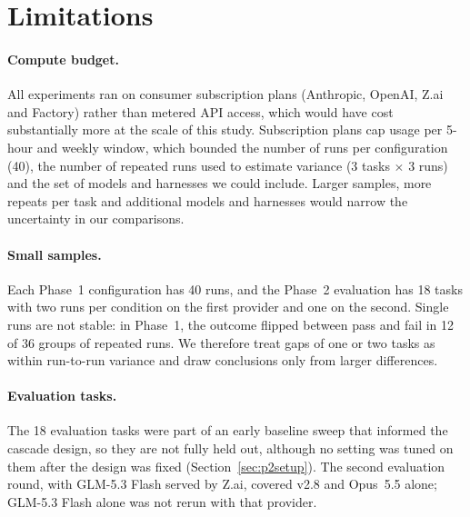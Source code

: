 \section{Limitations}

\paragraph{Compute budget.}
All experiments ran on consumer subscription plans (Anthropic, OpenAI, Z.ai and Factory) rather than metered API
access, which would have cost substantially more at the scale of this study. Subscription plans cap usage per
5-hour and weekly window, which bounded the number of runs per configuration (40), the number of repeated runs
used to estimate variance (3 tasks $\times$ 3 runs) and the set of models and harnesses we could include. Larger
samples, more repeats per task and additional models and harnesses would narrow the uncertainty in our
comparisons.

\paragraph{Small samples.}
Each Phase~1 configuration has 40 runs, and the Phase~2 evaluation has 18 tasks with two runs per condition on
the first provider and one on the second. Single runs are not stable: in Phase~1, the outcome flipped between
pass and fail in 12 of 36 groups of repeated runs. We therefore treat gaps of one or two tasks as within
run-to-run variance and draw conclusions only from larger differences.

\paragraph{Evaluation tasks.}
The 18 evaluation tasks were part of an early baseline sweep that informed the cascade design, so they are not
fully held out, although no setting was tuned on them after the design was fixed (Section~\ref{sec:p2setup}).
The second evaluation round, with GLM-5.3 Flash served by Z.ai, covered v2.8 and Opus~5.5 alone; GLM-5.3 Flash
alone was not rerun with that provider.

